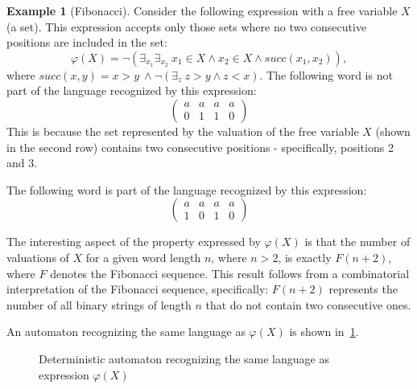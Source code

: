 \documentclass[en]{pracamgr}
\newcommand{\icol}[1]{%
  \left(\begin{smallmatrix}#1\end{smallmatrix}\right)%
}
\theoremstyle{definition}
\newtheorem{example}{Example}[section]
\begin{document}
\begin{example}[Fibonacci]
    \label{ExFib}
    Consider the following expression with a free variable $X$ (a set). This expression accepts only those sets where no two consecutive positions are included in the set:
    $$\varphi(X) = \neg(\exists_{x_1}\exists_{x_2} \ x_1 \in X \land x_2 \in X \land succ(x_1, x_2)),$$
    where $succ(x,y) = x > y~\land \neg (\exists_z \ z > y \land z < x)$.
    The following word is not part of the language recognized by this expression:
    $$\begin{pmatrix}
        a & a & a & a\\
        0 & 1 & 1 & 0
    \end{pmatrix}$$
    This is because the set represented by the valuation of the free variable $X$ (shown in the second row) contains two consecutive positions - specifically, positions 2 and 3.

    The following word is part of the language recognized by this expression:
    $$\begin{pmatrix}
        a & a & a & a\\
        1 & 0 & 1 & 0
    \end{pmatrix}$$

    The interesting aspect of the property expressed by $\varphi(X)$ is that the number of valuations of $X$ for a given word length $n$, where $n > 2$, is exactly $F(n + 2)$, where $F$ denotes the Fibonacci sequence. This result follows from a combinatorial interpretation of the Fibonacci sequence, specifically: $F(n+2)$ represents the number of all binary strings of length $n$ that do not contain two consecutive ones.

    An automaton recognizing the same language as $\varphi(X)$ is shown in~\cref{fig:my_label}.

    \begin{figure}[ht]
        \centering
        \caption{Deterministic automaton recognizing the same language as expression $\varphi(X)$}
        \label{fig:my_label}
    \end{figure}
\end{example} \
\end{document}
